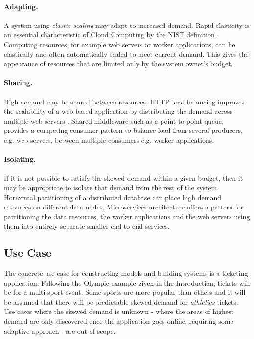 \documentclass[runningheads]{llncs}
\begin{document}
\paragraph{Adapting.} A system using {\itshape elastic scaling} may adapt to increased demand. Rapid elasticity is an essential characteristic of Cloud Computing by the NIST definition \cite{RN56}.  Computing resources, for example web servers or worker applications, can be elastically and often automatically scaled to meet current demand.  This gives the appearance of resources that are limited only by the system owner's budget.

\paragraph{Sharing.} High demand may be shared between resources.  HTTP load balancing improves the scalability of a web-based application by distributing the demand across multiple web servers \cite{RN73}.  Shared middleware such as a point-to-point queue, provides a competing consumer pattern to balance load from several producers, e.g. web servers, between multiple consumers e.g. worker applications.

\paragraph{Isolating.} If it is not possible to satisfy the skewed demand within a given budget, then it may be appropriate to isolate that demand from the rest of the system.  Horizontal partitioning of a distributed database can place high demand resources on different data nodes.  Microservices architecture offers a pattern for partitioning the data resources, the worker applications and the web servers using them into entirely separate smaller end to end services.

\subsection{Use Case}

The concrete use case for constructing models and building systems is a ticketing application.  Following the Olympic example given in the Introduction, tickets will be for a multi-sport event.  Some sports are more popular than others and it will be assumed that there will be predictable skewed demand for {\itshape athletics} tickets.  Use cases where the skewed demand is unknown - where the areas of highest demand are only discovered once the application goes online, requiring some adaptive approach - are out of scope.
\end{document}
